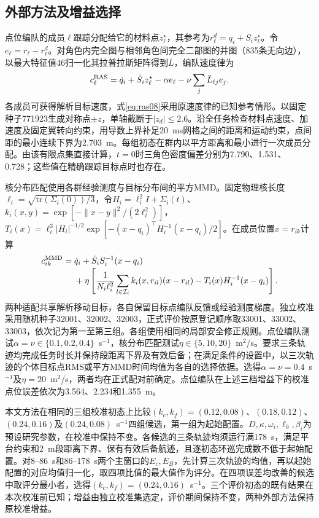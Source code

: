 \documentclass[UTF8,a4paper,11pt,fontset=none]{ctexart}
\begin{document}
\subsection{外部方法及增益选择}
点位编队的成员$\ell$跟踪分配给它的材料点$z_\ell^\star$，其参考为$r_\ell^d=q_i+S_i z_\ell^\star$。令$e_\ell=r_\ell-r_\ell^d$。对角色内完全图与相邻角色间完全二部图的并图（835条无向边），以最大特征值46归一化其拉普拉斯矩阵得到$\bar L$，编队速度律为
\begin{equation}
 c_\ell^{\rm RAS}=\dot q_i+\dot S_i z_\ell^\star-\alpha e_\ell-\nu\sum_j\bar L_{\ell j}e_j .
 \label{eq:ras08}
\end{equation}
各成员可获得解析目标速度，式\eqref{eq:ras08}采用原速度律的已知参考情形。以固定种子771923生成对称点$\pm z$，单轴截断于$|z_d|\le2.6$。沿全任务检查材料点速度、加速度及固定翼转向约束，用导数上界补足20~ms网格之间的距离和运动约束，点间距的最小连续下界为2.703~m。每组初态在群内以平方距离和最小进行一次成员分配。由该有限点集直接计算，$t=0$时三角色密度偏差分别为7.790、1.531、0.728；这些值在精确跟踪目标点时也存在。

核分布匹配使用各群经验测度与目标分布间的平方MMD。固定物理核长度$\ell_i=\sqrt{\mathrm{tr}(\Sigma_i(0))/3}$，令$H_i=\ell_i^2 I+\Sigma_i(t)$、$k_i(x,y)=\exp[-\|x-y\|^2/(2\ell_i^2)]$，$T_i(x)=\ell_i^3|H_i|^{-1/2}\exp[-(x-q_i)^\top H_i^{-1}(x-q_i)/2]$。在成员位置$x=r_{ik}$计算
\begin{equation}
\begin{split}
 c_{ik}^{\rm MMD}={}&\dot q_i+\dot S_i S_i^{-1}(x-q_i)\\[-2pt]
 &+\eta\left[\frac{1}{N_i\ell_i^2}\sum_{l\in\mathcal I_i} k_i(x,r_{il})(x-r_{il})
             -T_i(x)H_i^{-1}(x-q_i)\right].
\end{split}\label{eq:mmd19}
\end{equation}
两种适配共享解析移动目标，各自保留目标点编队反馈或经验测度梯度。独立校准采用随机种子32001、32002、32003，正式评价按原登记顺序取33001、33002、33003，依次记为第一至第三组。各组使用相同的局部安全修正规则。点位编队测试$\alpha=\nu\in\{0.1,0.2,0.4\}$~s$^{-1}$，核分布匹配测试$\eta\in\{5,10,20\}$~m$^2$/s。要求三条轨迹均完成任务时长并保持段距离下界及有效后备；在满足条件的设置中，以三次轨迹的个体目标点RMS或平方MMD时间均值为各自的选择依据。选得$\alpha=\nu=0.4$~s$^{-1}$及$\eta=20$~m$^2$/s，两者均在正式配对前确定。点位编队在上述三档增益下的校准点位误差依次为3.564、2.234和1.355~m。

本文方法在相同的三组校准初态上比较$(k_c,k_f)=(0.12,0.08)$、$(0.18,0.12)$、$(0.24,0.16)$及$(0.24,0.08)$~s$^{-1}$四组候选，第一组为起始配置。$D,\kappa,\omega_i,\ell_0,\beta_i$为预设研究参数，在校准中保持不变。各候选的三条轨迹均须运行满178~s，满足平台约束和2~m段距离下界、保有有效后备航迹，且逐初态环巡完成数不低于起始配置。对8--86~s和86--178~s两个主窗口的$E_c,E_B$，先计算三次轨迹的均值，再以起始配置的对应均值归一化，取四项比值的最大值作为评分。在四项误差均改善的候选中取评分最小者，选得$(k_c,k_f)=(0.24,0.16)$~s$^{-1}$。三个评价初态的既有结果在本次校准前已知；增益由独立校准集选定，评价期间保持不变，两种外部方法保持原校准增益。
\end{document}
